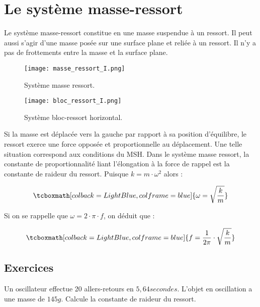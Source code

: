 \chapter{Le système masse-ressort}
Le système masse-ressort constitue en une masse suspendue à un ressort. Il peut aussi s'agir d'une masse posée sur une surface plane et reliée à un ressort. Il n'y a pas de frottements entre la masse et la surface plane.

\begin{figure}[h!]
    \begin{minipage}{.5\textwidth}
        \centering
        \texttt{[image: masse\_ressort\_I.png]}
        \caption{Système masse ressort.}
        \label{masse_ressort_I}
    \end{minipage}
    \begin{minipage}{.5\textwidth}
        \centering
        \texttt{[image: bloc\_ressort\_I.png]}
        \caption{Système bloc-ressort horizontal.}
        \label{bloc_ressort_I}
    \end{minipage}
\end{figure}

\newpage

Si la masse est déplacée vers la gauche par rapport à sa position d'équilibre, le ressort exerce une force opposée  et proportionnelle au déplacement. Une telle situation correspond aux conditions du MSH.
Dans le système masse ressort, la constante de proportionnalité liant l'élongation à la force de rappel est la constante de raideur du ressort. Puisque \(k=m \cdot \omega ^2\) alors :

\begin{equation}
    \tcboxmath[colback=LightBlue,colframe=blue]
    {\omega = \sqrt{\frac{k}{m}}}
\end{equation}


Si on se rappelle que \(\omega=2 \cdot \pi \cdot f\), on déduit que :

\begin{equation}
    \tcboxmath[colback=LightBlue,colframe=blue]
    {f=\frac{1}{2\pi} \cdot \sqrt{\frac{k}{m}}}
\end{equation}

\newpage

\section{Exercices}
\begin{exercise}
    Un oscillateur effectue 20 allers-retours en \(5,64 secondes\). L'objet en oscillation a une masse de \(145g\). Calcule la constante de raideur du ressort.
\end{exercise}

